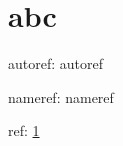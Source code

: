 \documentclass{article}
\begin{document}
\section{abc}
\label{foo}

autoref:  \csname autoref

nameref:  \csname nameref

ref: \ref{foo}
\end{document}
